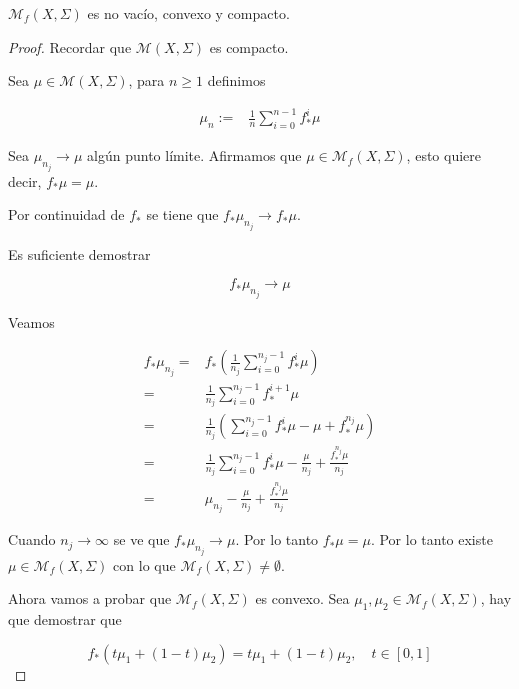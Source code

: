 \begin{teorema}
	$\mathcal{M}_f(X,\Sigma)$ es no vacío, convexo y compacto.
\end{teorema}

\begin{proof}
	Recordar que $\mathcal{M}(X,\Sigma)$ es compacto.
	
	Sea $\mu \in \mathcal{M}(X,\Sigma)$, para $n \geq 1$ definimos
	
	\begin{align}
		\mu_n :=& \frac{1}{n} \sum_{i=0}^{n-1} f_*^i \mu
	\end{align}
	
		Sea $\mu_{n_j} \rightarrow \mu$ algún punto límite. Afirmamos que $\mu \in \mathcal{M}_f(X,\Sigma)$, esto quiere decir, $f_*\mu = \mu$.
	
	Por continuidad de $f_*$ se tiene que $f_*\mu_{n_j} \rightarrow f_*\mu$.
	
	Es suficiente demostrar
	
	\begin{equation}
	f_*\mu_{n_j} \rightarrow \mu
	\end{equation}
	
	Veamos
	
	\begin{align}
	f_*\mu_{n_j} =& f_* \left( \frac{1}{n_j} \sum_{i=0}^{n_j-1} f^i_* \mu \right)\\
	=& \frac{1}{n_j} \sum_{i=0}^{n_j-1} f_*^{i+1} \mu\\
	=& \frac{1}{n_j} \left( \sum_{i=0}^{n_j-1} f^i_* \mu - \mu + f^{n_j}_* \mu \right)\\
	=& \frac{1}{n_j} \sum_{i=0}^{n_j-1} f^i_* \mu - \frac{\mu}{n_j} + \frac{f^{n_j}_* \mu}{n_j}\\
	=& \mu_{n_j} - \frac{\mu}{n_j} + \frac{f^{n_j}_* \mu}{n_j}
	\end{align}
	
	Cuando $n_j \rightarrow \infty$ se ve que $f_* \mu_{n_j} \rightarrow \mu$. Por lo tanto $f_*\mu=\mu$. Por lo tanto existe $\mu \in \mathcal{M}_f(X,\Sigma)$ con lo que $\mathcal{M}_f(X,\Sigma) \neq \emptyset$.
	
	Ahora vamos a probar que $\mathcal{M}_f(X,\Sigma)$ es convexo. Sea $\mu_1,\mu_2 \in \mathcal{M}_f(X,\Sigma)$, hay que demostrar que
	
	\begin{equation}
	f_*(t\mu_1 + (1-t)\mu_2) = t\mu_1 + (1-t)\mu_2, \quad t \in [0,1]
	\end{equation}
	

\end{proof}
